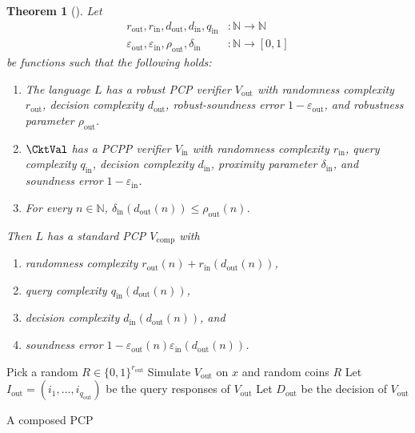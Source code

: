 \documentclass[english,12pt]{reedthesis}
\theoremstyle{plain}
\newtheorem{thm}{Theorem}[section]
\theoremstyle{definition}
\theoremstyle{remark}
\DeclareMathOperator{\comp}{comp}
\DeclareMathOperator{\out}{out}
\DeclareMathOperator{\oin}{in}
\begin{document}
\begin{thm}[{\cite[Theorem 2.7]{BGHSV06}}]\label{thm:composition}
  Let
  \begin{align*}
    r_{\out}, r_{\oin}, d_{\out}, d_{\oin}, q_{\oin}&\colon \mathbb{N} \rightarrow \mathbb{N} \\
    \varepsilon_{\out}, \varepsilon_{\oin}, \rho_{\out}, \delta_{\oin}&\colon \mathbb{N} \rightarrow [0, 1]
  \end{align*}
  be functions such that the following holds:
  \begin{enumerate}
    \item The language $L$ has a robust PCP verifier $V_{\out}$ with randomness
          complexity $r_{\out}$, decision complexity $d_{\out}$,
          robust-soundness error $1 - \varepsilon_{\out}$, and robustness parameter
          $\rho_{\out}$.
    \item $\CktVal$ has a PCPP verifier $V_{\oin}$ with randomness complexity
          $r_{\oin}$, query complexity $q_{\oin}$, decision complexity
          $d_{\oin}$, proximity parameter $\delta_{\oin}$, and soundness error
          $1 - \varepsilon_{\oin}$.
    \item For every $n \in \mathbb{N}$, $\delta_{\oin}(d_{\out}(n)) \le \rho_{\out}(n)$.
  \end{enumerate}
  Then $L$ has a standard PCP $V_{\comp}$ with
  \begin{enumerate}[label=\alph*.]
    \item randomness complexity $r_{\out}(n) + r_{\oin}(d_{\out}(n))$,
    \item query complexity $q_{\oin}(d_{\out}(n))$,
    \item decision complexity $d_{\oin}(d_{\out}(n))$, and
    \item soundness error $1 - \varepsilon_{\out}(n)\varepsilon_{\oin}(d_{\out}(n))$.
  \end{enumerate}
\end{thm}

\begin{algorithm}[htbp]
  Pick a random $R \in \{0, 1\}^{r_{\out}}$\;
  Simulate $V_{\out}$ on $x$ and random coins $R$\;
  Let $I_{\out} = (i_{1}, \ldots, i_{q_{\out}})$ be the query responses of
  $V_{\out}$\;
  Let $D_{\out}$ be the decision of $V_{\out}$\;
  \caption{A composed PCP~\cite[Theorem 2.7]{BGHSV06}}\label{alg:composed-pcp}
\end{algorithm}
\end{document}
